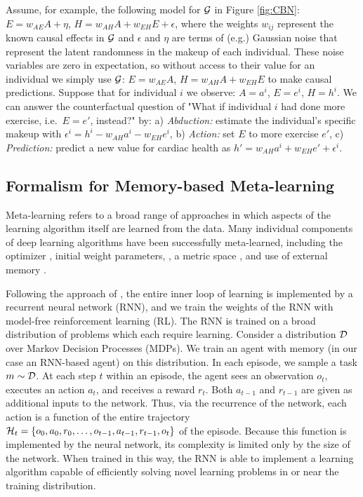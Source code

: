Assume, for example, the following model for ${\cal G}$ in Figure \ref{fig:CBN}: $E=w_{AE}A + \eta$, $H=w_{AH}A+w_{EH}E+\epsilon$,
where the weights $w_{ij}$ represent the known causal effects in $\cal G$ and $\epsilon$ and $\eta$ are terms of (e.g.) Gaussian noise that represent the latent randomness in the makeup of each individual. These noise variables are zero in expectation, so without access to their value for an individual we simply use ${\cal G}$: $E=w_{AE}A$, $H=w_{AH}A+w_{EH}E$ to make causal predictions. Suppose that for individual $i$ we observe: $A = a^i$, $E = e^i$, $H = h^i$. We can answer the counterfactual question of "What if individual $i$ had done more exercise, i.e.~$E=e'$, instead?" by: a) \emph{Abduction:} estimate the individual's specific makeup with $\epsilon^i=h^i-w_{AH}a^i-w_{EH}e^i$, b) \emph{Action:} set $E$ to more exercise $e'$, c) \emph{Prediction:} predict a new value for cardiac health as $h'=w_{AH}a^i+w_{EH}e'+\epsilon^i$. 

\subsection{Formalism for Memory-based Meta-learning}
\label{sec:meta-formalism}

Meta-learning refers to a broad range of approaches in which aspects of the learning algorithm itself are learned from the data. Many individual components of deep learning algorithms have been successfully meta-learned, including the optimizer \citep{andrychowicz2016learning}, initial weight parameters, \citep{finn2017model}, a metric space \citep{vinyals2016matching}, and use of external memory \citep{santoro2016meta}. 

Following the approach of \citep{duan2016RL2,wang2016}, the entire inner loop of learning is implemented by a recurrent neural network (RNN), and we train the weights of the RNN with model-free reinforcement learning (RL). The RNN is trained on a broad distribution of problems which each require learning. Consider a distribution ${\cal D}$ over Markov Decision Processes (MDPs). We train an agent with memory (in our case an RNN-based agent) on this distribution. In each episode, we sample a task $m\sim {\cal D}$. At each step $t$ within an episode, the agent sees an observation $o_t$, executes an action $a_t$, and receives a reward $r_t$. Both $a_{t-1}$ and $r_{t-1}$ are given as additional inputs to the network. Thus, via the recurrence of the network, each action is a function of the entire trajectory ${\cal H}_{t}=\{ o_0, a_0, r_0, \dots, o_{t-1}, a_{t-1}, r_{t-1}, o_t\}$ of the episode. Because this function is implemented by the neural network, its complexity is limited only by the size of the network. When trained in this way, the RNN is able to implement a learning algorithm capable of efficiently solving novel learning problems in or near the training distribution.

